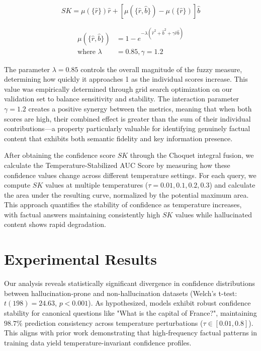 \documentclass[sigconf]{acmart}
\begin{document}
\begin{equation}
SK = \mu(\{\hat{r}\})\hat{r} + [\mu(\{\hat{r}, \hat{b}\}) - \mu(\{\hat{r}\})]\hat{b}
\end{equation}

\begin{align}
\mu(\{\hat{r}, \hat{b}\}) &= 1 - e^{-\lambda(\hat{r}^2+\hat{b}^2+\gamma \hat{r}\hat{b})} \\
\text{where } \lambda &= 0.85, \gamma = 1.2
\end{align}

The parameter $\lambda=0.85$ controls the overall magnitude of the fuzzy measure, determining how quickly it approaches 1 as the individual scores increase. This value was empirically determined through grid search optimization on our validation set to balance sensitivity and stability. The interaction parameter $\gamma=1.2$ creates a positive synergy between the metrics, meaning that when both scores are high, their combined effect is greater than the sum of their individual contributions—a property particularly valuable for identifying genuinely factual content that exhibits both semantic fidelity and key information presence.

After obtaining the confidence score $SK$ through the Choquet integral fusion, we calculate the Temperature-Stabilized AUC Score by measuring how these confidence values change across different temperature settings. For each query, we compute $SK$ values at multiple temperatures ($\tau = 0.01, 0.1, 0.2, 0.3$) and calculate the area under the resulting curve, normalized by the potential maximum area. This approach quantifies the stability of confidence as temperature increases, with factual answers maintaining consistently high $SK$ values while hallucinated content shows rapid degradation.


\section{Experimental Results}

Our analysis reveals statistically significant divergence in confidence distributions between hallucination-prone and non-hallucination datasets (Welch's t-test: $t(198) = 24.63$, $p < 0.001$). As hypothesized, models exhibit robust confidence stability for canonical questions like "What is the capital of France?", maintaining $98.7\%$ prediction consistency across temperature perturbations ($\tau \in [0.01, 0.8]$). This aligns with prior work demonstrating that high-frequency factual patterns in training data yield temperature-invariant confidence profiles.
\end{document}
